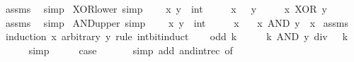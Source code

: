 \begin{isabellebody}
\ assms\ \isamarkupfalse%
\ simp%
\endisatagproof
{\isafoldproof}%
%
\isadelimproof
\isanewline
%
\endisadelimproof
\isanewline
{}\isamarkupfalse%
\ XOR{\isacharunderscore}{\kern0pt}lower\ {\isacharbrackleft}{\kern0pt}simp{\isacharbrackright}{\kern0pt}{\isacharcolon}{\kern0pt}\ \isanewline
\ \ \ x\ y\ {\isacharcolon}{\kern0pt}{\isacharcolon}{\kern0pt}\ int\isanewline
\ \ \ {\isacartoucheopen}{}\ {\isasymle}\ x{\isacartoucheclose}\ {\isacartoucheopen}{}\ {\isasymle}\ y{\isacartoucheclose}\isanewline
\ \ \ {\isacartoucheopen}{}\ {\isasymle}\ x\ XOR\ y{\isacartoucheclose}\isanewline
%
\isadelimproof
\ \ %
\endisadelimproof
%
\isatagproof
{}\isamarkupfalse%
\ assms\ \isamarkupfalse%
\ simp%
\endisatagproof
{\isafoldproof}%
%
\isadelimproof
\isanewline
%
\endisadelimproof
\isanewline
{}\isamarkupfalse%
\ AND{\isacharunderscore}{\kern0pt}upper{}\ {\isacharbrackleft}{\kern0pt}simp{\isacharbrackright}{\kern0pt}{\isacharcolon}{\kern0pt}\ \isanewline
\ \ \ x\ y\ {\isacharcolon}{\kern0pt}{\isacharcolon}{\kern0pt}\ int\isanewline
\ \ \ {\isacartoucheopen}{}\ {\isasymle}\ x{\isacartoucheclose}\isanewline
\ \ \ {\isacartoucheopen}x\ AND\ y\ {\isasymle}\ x{\isacartoucheclose}\isanewline
%
\isadelimproof
%
\endisadelimproof
%
\isatagproof
{}\isamarkupfalse%
\ assms\ \isamarkupfalse%
\ {\isacharparenleft}{\kern0pt}induction\ x\ arbitrary{\isacharcolon}{\kern0pt}\ y\ rule{\isacharcolon}{\kern0pt}\ int{\isacharunderscore}{\kern0pt}bit{\isacharunderscore}{\kern0pt}induct{\isacharparenright}{\kern0pt}\isanewline
\ \ \isamarkupfalse%
\ {\isacharparenleft}{\kern0pt}odd\ k{\isacharparenright}{\kern0pt}\isanewline
\ \ \isamarkupfalse%
\ \isamarkupfalse%
\ {\isacartoucheopen}k\ AND\ y\ div\ {}\ {\isasymle}\ k{\isacartoucheclose}\isanewline
\ \ \ \ \isamarkupfalse%
\ simp\isanewline
\ \ \isamarkupfalse%
\ \isamarkupfalse%
\ {\isacharquery}{\kern0pt}case\ \isanewline
\ \ \ \ \isamarkupfalse%
\ {\isacharparenleft}{\kern0pt}simp\ add{\isacharcolon}{\kern0pt}\ and{\isacharunderscore}{\kern0pt}int{\isacharunderscore}{\kern0pt}rec\ {\isacharbrackleft}{\kern0pt}of\ {\isacartoucheopen}{}\ {\isacharplus}{\kern0pt}\ {\isacharunderscore}{\kern0pt}\ {\isacharasterisk}{\kern0pt}\ {}{\isacartoucheclose}{\isacharbrackright}{\kern0pt}{\isacharparenright}{\kern0pt}\isanewline

\end{isabellebody}
